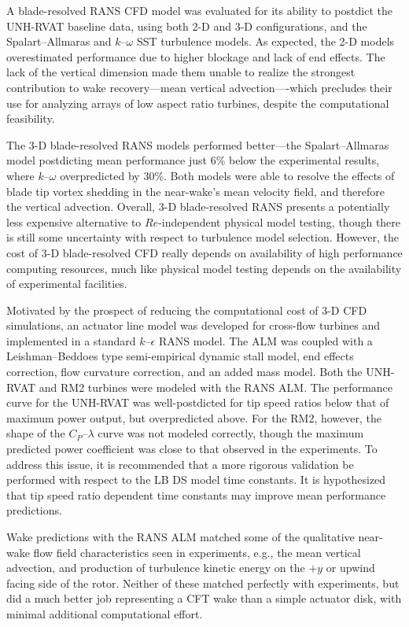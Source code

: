 A blade-resolved RANS CFD model was evaluated for its ability to postdict the
UNH-RVAT baseline data, using both 2-D and 3-D configurations, and the
Spalart--Allmaras and $k$--$\omega$ SST turbulence models. As expected, the 2-D
models overestimated performance due to higher blockage and lack of end effects.
The lack of the vertical dimension made them unable to realize the strongest
contribution to wake recovery---mean vertical advection----which precludes their
use for analyzing arrays of low aspect ratio turbines, despite the computational
feasibility.

The 3-D blade-resolved RANS models performed better---the Spalart--Allmaras
model postdicting mean performance just 6\% below the experimental results,
where $k$--$\omega$ overpredicted by 30\%. Both models were able to resolve the
effects of blade tip vortex shedding in the near-wake's mean velocity field, and
therefore the vertical advection. Overall, 3-D blade-resolved RANS presents a
potentially less expensive alternative to $Re$-independent physical model
testing, though there is still some uncertainty with respect to turbulence model
selection. However, the cost of 3-D blade-resolved CFD really depends on
availability of high performance computing resources, much like physical model
testing depends on the availability of experimental facilities.

Motivated by the prospect of reducing the computational cost of 3-D CFD
simulations, an actuator line model was developed for cross-flow turbines and
implemented in a standard $k$--$\epsilon$ RANS model. The ALM was coupled with a
Leishman--Beddoes type semi-empirical dynamic stall model, end effects
correction, flow curvature correction, and an added mass model. Both the
UNH-RVAT and RM2 turbines were modeled with the RANS ALM. The performance curve
for the UNH-RVAT was well-postdicted for tip speed ratios below that of maximum
power output, but overpredicted above. For the RM2, however, the shape of the
$C_P$--$\lambda$ curve was not modeled correctly, though the maximum predicted
power coefficient was close to that observed in the experiments. To address this
issue, it is recommended that a more rigorous validation be performed with
respect to the LB DS model time constants. It is hypothesized that tip speed
ratio dependent time constants may improve mean performance predictions.

Wake predictions with the RANS ALM matched some of the qualitative near-wake
flow field characteristics seen in experiments, e.g., the mean vertical
advection, and production of turbulence kinetic energy on the $+y$ or upwind
facing side of the rotor. Neither of these matched perfectly with experiments,
but did a much better job representing a CFT wake than a simple actuator disk,
with minimal additional computational effort.

